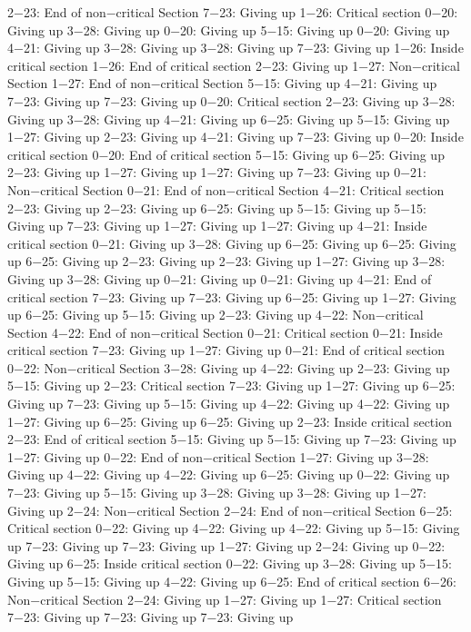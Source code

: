 2−23: End of non−critical Section
7−23: Giving up
1−26: Critical section
0−20: Giving up
3−28: Giving up
0−20: Giving up
5−15: Giving up
0−20: Giving up
4−21: Giving up
3−28: Giving up
3−28: Giving up
7−23: Giving up
1−26: Inside critical section
1−26: End of critical section
2−23: Giving up
1−27: Non−critical Section
1−27: End of non−critical Section
5−15: Giving up
4−21: Giving up
7−23: Giving up
7−23: Giving up
0−20: Critical section
2−23: Giving up
3−28: Giving up
3−28: Giving up
4−21: Giving up
6−25: Giving up
5−15: Giving up
1−27: Giving up
2−23: Giving up
4−21: Giving up
7−23: Giving up
0−20: Inside critical section
0−20: End of critical section
5−15: Giving up
6−25: Giving up
2−23: Giving up
1−27: Giving up
1−27: Giving up
7−23: Giving up
0−21: Non−critical Section
0−21: End of non−critical Section
4−21: Critical section
2−23: Giving up
2−23: Giving up
6−25: Giving up
5−15: Giving up
5−15: Giving up
7−23: Giving up
1−27: Giving up
1−27: Giving up
4−21: Inside critical section
0−21: Giving up
3−28: Giving up
6−25: Giving up
6−25: Giving up
6−25: Giving up
2−23: Giving up
2−23: Giving up
1−27: Giving up
3−28: Giving up
3−28: Giving up
0−21: Giving up
0−21: Giving up
4−21: End of critical section
7−23: Giving up
7−23: Giving up
6−25: Giving up
1−27: Giving up
6−25: Giving up
5−15: Giving up
2−23: Giving up
4−22: Non−critical Section
4−22: End of non−critical Section
0−21: Critical section
0−21: Inside critical section
7−23: Giving up
1−27: Giving up
0−21: End of critical section
0−22: Non−critical Section
3−28: Giving up
4−22: Giving up
2−23: Giving up
5−15: Giving up
2−23: Critical section
7−23: Giving up
1−27: Giving up
6−25: Giving up
7−23: Giving up
5−15: Giving up
4−22: Giving up
4−22: Giving up
1−27: Giving up
6−25: Giving up
6−25: Giving up
2−23: Inside critical section
2−23: End of critical section
5−15: Giving up
5−15: Giving up
7−23: Giving up
1−27: Giving up
0−22: End of non−critical Section
1−27: Giving up
3−28: Giving up
4−22: Giving up
4−22: Giving up
6−25: Giving up
0−22: Giving up
7−23: Giving up
5−15: Giving up
3−28: Giving up
3−28: Giving up
1−27: Giving up
2−24: Non−critical Section
2−24: End of non−critical Section
6−25: Critical section
0−22: Giving up
4−22: Giving up
4−22: Giving up
5−15: Giving up
7−23: Giving up
7−23: Giving up
1−27: Giving up
2−24: Giving up
0−22: Giving up
6−25: Inside critical section
0−22: Giving up
3−28: Giving up
5−15: Giving up
5−15: Giving up
4−22: Giving up
6−25: End of critical section
6−26: Non−critical Section
2−24: Giving up
1−27: Giving up
1−27: Critical section
7−23: Giving up
7−23: Giving up
7−23: Giving up
